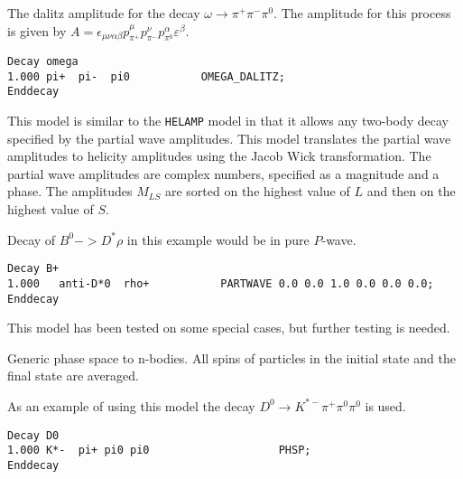

\Expl
The dalitz amplitude for the decay $\omega\rightarrow \pi^+\pi^-\pi^0$.
The amplitude for this process is given by 
$A=\epsilon_{\mu\nu\alpha\beta}
p^{\mu}_{\pi^+}p^{\nu}_{\pi^-}p^{\alpha}_{\pi^0}\varepsilon^{\beta}$.

\Example
\begin{verbatim}
Decay omega
1.000 pi+  pi-  pi0           OMEGA_DALITZ;
Enddecay
\end{verbatim}




\label{partwave}



\Expl
This model is similar to the {\tt HELAMP} model in that it allows
any two-body decay specified by the partial wave amplitudes. This model
translates the partial wave amplitudes to helicity amplitudes using the 
Jacob Wick transformation. The partial wave amplitudes are complex numbers,
specified as a magnitude and a phase. The amplitudes $M_{LS}$ are
sorted on the highest value of $L$ and then on the highest value of $S$.

\Example
Decay of $B^0->D^*\rho$ in this example would be in pure $P$-wave.
\begin{verbatim}
Decay B+
1.000   anti-D*0  rho+           PARTWAVE 0.0 0.0 1.0 0.0 0.0 0.0;
Enddecay
\end{verbatim}

\Notes
This model has been tested on
some special cases, but further testing is needed.






\label{phsp}



\Expl
Generic phase space to n-bodies. All spins of particles in
the initial state and the final state are averaged.

\Example
As an example of using this model the decay 
$D^0\rightarrow K^{*-}\pi^+\pi^0\pi^0$
is used.
\begin{verbatim}
Decay D0
1.000 K*-  pi+ pi0 pi0                    PHSP;
Enddecay
\end{verbatim}



